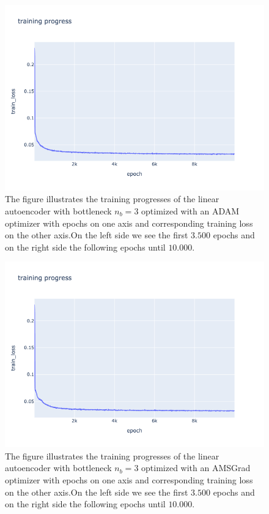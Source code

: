 \begin{figure}
\begin{center}
\includegraphics[width=\linewidth]{linear_AE_3d_adam_training_progress}
\end{center}
\caption{The figure illustrates the training progresses of the linear autoencoder with bottleneck $n_b=3$ optimized with an ADAM optimizer with epochs on one axis and corresponding training loss on the other axis.On the left side we see the first $3.500$ epochs and on the right side the following epochs until $10.000$.}\label{fig:linear_AE_3d_adam_training_progress}
\end{figure}


\begin{figure}
\begin{center}
\includegraphics[width=\linewidth]{linear_AE_3d_amsgrad_training_progress}
\end{center}
\caption{The figure illustrates the training progresses of the linear autoencoder with bottleneck $n_b=3$ optimized with an AMSGrad optimizer with epochs on one axis and corresponding training loss on the other axis.On the left side we see the first $3.500$ epochs and on the right side the following epochs until $10.000$.}\label{fig:linear_AE_3d_amsgrad_training_progress}
\end{figure}


